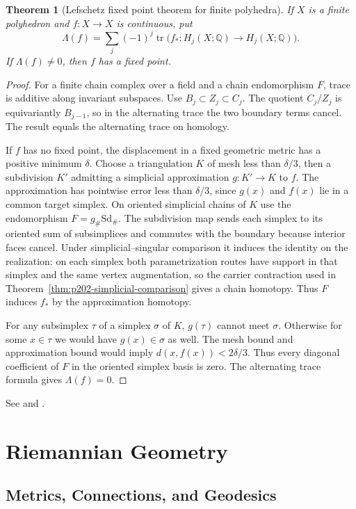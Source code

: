 \documentclass[11pt,oneside,openany]{book}
\theoremstyle{plain}
\newtheorem{theorem}{Theorem}[chapter]
\theoremstyle{definition}
\theoremstyle{remark}
\begin{document}
\begin{theorem}[Lefschetz fixed point theorem for finite polyhedra]
\label{thm:p202-fixed-point}
If \(X\) is a finite polyhedron and \(f:X\to X\) is
continuous, put
\[
 \Lambda(f)=\sum_j(-1)^j
            \operatorname{tr}\bigl(f_*:H_j(X;\mathbb Q)
                                      \to H_j(X;\mathbb Q)\bigr).
\]
If \(\Lambda(f)\ne0\), then \(f\) has a fixed point.
\end{theorem}
\begin{proof}
For a finite chain complex over a field and a chain
endomorphism \(F\), trace is additive along invariant
subspaces. Use \(B_j\subset Z_j\subset C_j\).
The quotient \(C_j/Z_j\) is equivariantly \(B_{j-1}\),
so in the alternating trace the two boundary terms
cancel. The result equals the alternating trace on
homology.

If \(f\) has no fixed point, the displacement in a fixed
geometric metric has a positive minimum \(\delta\).
Choose a triangulation \(K\) of mesh less than
\(\delta/3\), then a subdivision \(K'\) admitting a
simplicial approximation \(g:K'\to K\) to \(f\).
The approximation has pointwise error less than
\(\delta/3\), since \(g(x)\) and \(f(x)\) lie in a
common target simplex. On oriented simplicial chains
of \(K\) use the endomorphism \(F=g_\#\mathrm{Sd}_\#\).
The subdivision map sends each simplex to its oriented
sum of subsimplices and commutes with the boundary
because interior faces cancel. Under simplicial--singular
comparison it induces the identity on the realization:
on each simplex both parametrization routes have support
in that simplex and the same vertex augmentation, so
the carrier contraction used in
Theorem~\ref{thm:p202-simplicial-comparison} gives a
chain homotopy. Thus \(F\) induces \(f_*\) by the
approximation homotopy.

For any subsimplex \(\tau\) of a simplex \(\sigma\)
of \(K\), \(g(\tau)\) cannot meet \(\sigma\).
Otherwise for some \(x\in\tau\) we would have
\(g(x)\in\sigma\) as well. The mesh bound and
approximation bound would imply
\(d(x,f(x))<2\delta/3\). Thus every diagonal coefficient
of \(F\) in the oriented simplex basis is zero.
The alternating trace formula gives \(\Lambda(f)=0\).
\end{proof}

See \cite[Section 2.C]{Hatcher} and \cite[Section 2.10]{MKP}.
\part{Riemannian Geometry}
\chapter{Metrics, Connections, and Geodesics}
\label{chap:p202-metrics}
\end{document}
